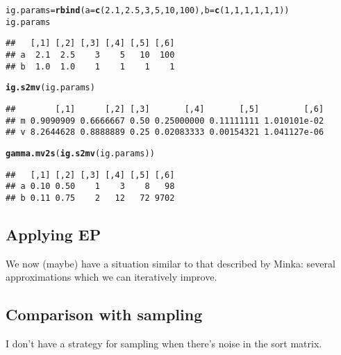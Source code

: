\documentclass{article}\usepackage[]{graphicx}\usepackage[]{color}
\makeatletter
\newcommand{\hlnum}[1]{\textcolor[rgb]{0.686,0.059,0.569}{#1}}%
\newcommand{\hlstd}[1]{\textcolor[rgb]{0.345,0.345,0.345}{#1}}%
\newcommand{\hlkwb}[1]{\textcolor[rgb]{0.69,0.353,0.396}{#1}}%
\newcommand{\hlkwc}[1]{\textcolor[rgb]{0.333,0.667,0.333}{#1}}%
\newcommand{\hlkwd}[1]{\textcolor[rgb]{0.737,0.353,0.396}{\textbf{#1}}}%
\newenvironment{kframe}{%
 \def\at@end@of@kframe{}%
 \ifinner\ifhmode%
  \def\at@end@of@kframe{\end{minipage}}%
  \begin{minipage}{\columnwidth}%
 \fi\fi%
 \def\FrameCommand##1{\hskip\@totalleftmargin \hskip-\fboxsep
 \colorbox{shadecolor}{##1}\hskip-\fboxsep
     \hskip-\linewidth \hskip-\@totalleftmargin \hskip\columnwidth}%
 \MakeFramed {\advance\hsize-\width
   \@totalleftmargin\z@ \linewidth\hsize
   \@setminipage}}%
 {\par\unskip\endMakeFramed%
 \at@end@of@kframe}
\newenvironment{knitrout}{}{} %
\makeatother
\begin{document}
\begin{knitrout}
\color{fgcolor}\begin{kframe}
\begin{alltt}
\hlstd{ig.params} \hlkwb{=} \hlkwd{rbind}\hlstd{(}\hlkwc{a}\hlstd{=}\hlkwd{c}\hlstd{(}\hlnum{2.1}\hlstd{,}\hlnum{2.5}\hlstd{,}\hlnum{3}\hlstd{,}\hlnum{5}\hlstd{,}\hlnum{10}\hlstd{,}\hlnum{100}\hlstd{),} \hlkwc{b}\hlstd{=}\hlkwd{c}\hlstd{(}\hlnum{1}\hlstd{,}\hlnum{1}\hlstd{,}\hlnum{1}\hlstd{,}\hlnum{1}\hlstd{,}\hlnum{1}\hlstd{,}\hlnum{1}\hlstd{))}
\hlstd{ig.params}
\end{alltt}
\begin{verbatim}
##   [,1] [,2] [,3] [,4] [,5] [,6]
## a  2.1  2.5    3    5   10  100
## b  1.0  1.0    1    1    1    1
\end{verbatim}
\begin{alltt}
\hlkwd{ig.s2mv}\hlstd{(ig.params)}
\end{alltt}
\begin{verbatim}
##        [,1]      [,2] [,3]       [,4]       [,5]         [,6]
## m 0.9090909 0.6666667 0.50 0.25000000 0.11111111 1.010101e-02
## v 8.2644628 0.8888889 0.25 0.02083333 0.00154321 1.041127e-06
\end{verbatim}
\begin{alltt}
\hlkwd{gamma.mv2s}\hlstd{(}\hlkwd{ig.s2mv}\hlstd{(ig.params))}
\end{alltt}
\begin{verbatim}
##   [,1] [,2] [,3] [,4] [,5] [,6]
## a 0.10 0.50    1    3    8   98
## b 0.11 0.75    2   12   72 9702
\end{verbatim}
\end{kframe}
\end{knitrout}


\subsection{Applying EP}

We now (maybe) have a situation similar to that
described by Minka: several approximations which we can
iteratively improve.




\subsection{Comparison with sampling}


I don't have a strategy for sampling when there's noise
in the sort matrix.
\end{document}
